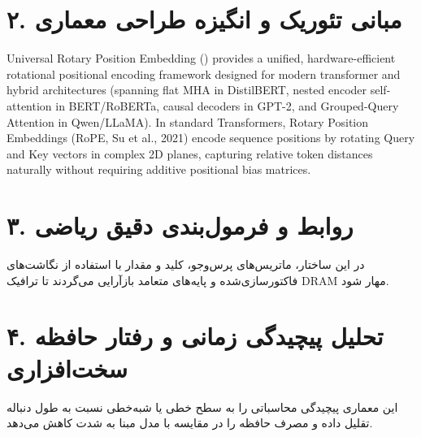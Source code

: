 \documentclass[12pt,a4paper]{article}
\begin{document}
\section*{۲. مبانی تئوریک و انگیزه طراحی معماری}
Universal Rotary Position Embedding () provides a unified, hardware-efficient rotational positional encoding framework designed for modern transformer and hybrid architectures (spanning flat MHA in DistilBERT, nested encoder self-attention in BERT/RoBERTa, causal decoders in GPT-2, and Grouped-Query Attention in Qwen/LLaMA). In standard Transformers, Rotary Position Embeddings (RoPE, Su et al., 2021) encode sequence positions by rotating Query and Key vectors in complex 2D planes, capturing relative token distances naturally without requiring additive positional bias matrices.

\section*{۳. روابط و فرمول‌بندی دقیق ریاضی}
در این ساختار، ماتریس‌های پرس‌وجو، کلید و مقدار با استفاده از نگاشت‌های فاکتورسازی‌شده و پایه‌های متعامد بازآرایی می‌گردند تا ترافیک DRAM مهار شود.

\section*{۴. تحلیل پیچیدگی زمانی و رفتار حافظه سخت‌افزاری}
این معماری پیچیدگی محاسباتی را به سطح خطی یا شبه‌خطی نسبت به طول دنباله تقلیل داده و مصرف حافظه را در مقایسه با مدل مبنا به شدت کاهش می‌دهد.
\end{document}

